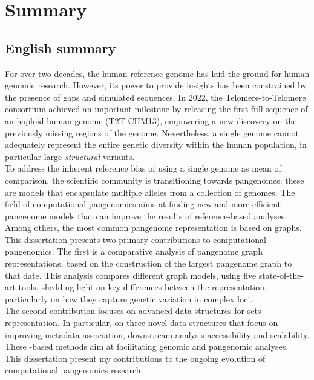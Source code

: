  \chapter{Summary}
\label{sec:Summary}
\section{English summary}
For over two decades, the human reference genome has laid the ground for human genomic research. However, its power to provide insights has been constrained by the presence of gaps and simulated sequences. In 2022, the Telomere-to-Telomere consortium achieved an important milestone by releasing the first full sequence of an haploid human genome (T2T-CHM13), empowering a new discovery on the previously missing regions of the genome. Nevertheless, a single genome cannot adequately represent the entire genetic diversity within the human population, in particular large \emph{structural} variants.\\
To address the inherent reference bias of using a single genome as mean of comparison, the scientific community is transitioning towards pangenomes: these are models that encapsulate multiple alleles from a collection of genomes. The field of computational pangenomics aims at finding new and more efficient pangenome models that can improve the results of reference-based analyses. Among others, the most common pangenome representation is based on graphs. \\
This dissertation presents two primary contributions to computational pangenomics. The first is a comparative analysis of pangenome graph representations, based on the construction of the largest pangenome graph to that date. This analysis compares different graph models, using five state-of-the-art tools, shedding light on key differences between the representation, particularly on how they capture genetic variation in complex loci.\\
The second contribution focuses on advanced data structures for \kmer sets representation. In particular, on three novel data structures that focus on improving metadata association, downstream analysis accessibility and scalability. These \kmer-based methods aim at facilitating genomic and pangenomic analyses.\\
This dissertation present my contributions to the ongoing evolution of computational pangenomics research.

